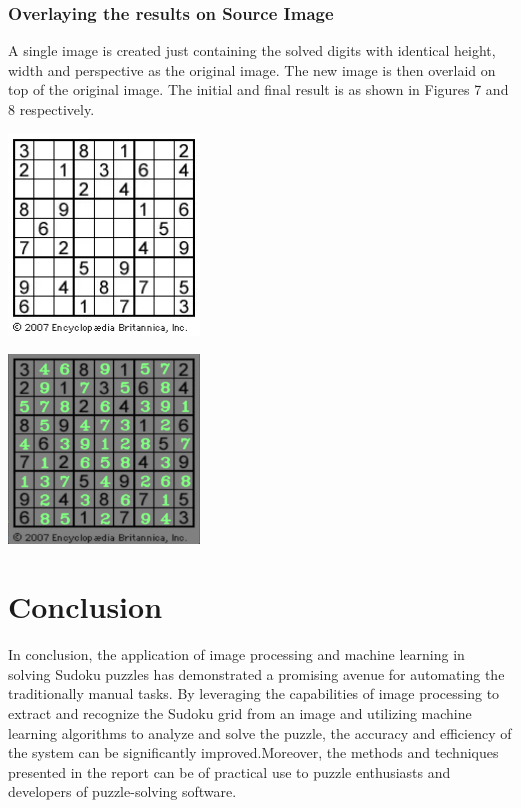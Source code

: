 \documentclass[a4paper,12pt]{article}
\begin{document}
\subsubsection{Overlaying the results on Source Image}
A single image is created just containing the solved digits with identical height, width and perspective as the original image. The new image is then overlaid on top of the original image. The initial and final result is as shown in Figures 7 and 8 respectively.
\begin{center}
        \includegraphics[width=2in]{2(1).png}
        \label{fig:figure_label}
\end{center}
\begin{center}
        \includegraphics[width=2in]{img_after.png}
        \label{fig:figure_label}
\end{center}
\section{Conclusion}
In conclusion, the application of image processing and machine learning in solving Sudoku puzzles has demonstrated a promising avenue for automating the traditionally manual tasks. By leveraging the capabilities of image processing to extract and recognize the Sudoku grid from an image and utilizing machine learning algorithms to analyze and solve the puzzle, the accuracy and efficiency of the system can be significantly improved.Moreover, the methods and techniques presented in the report can be of practical use to puzzle enthusiasts and developers of puzzle-solving software.
\end{document}
